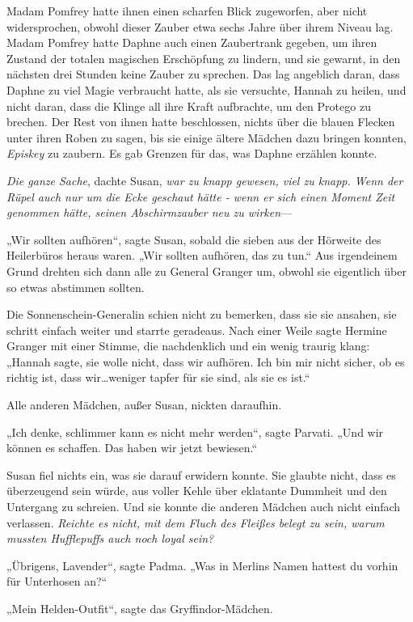 {Madam Pomfrey hatte ihnen einen scharfen Blick zugeworfen, aber nicht widersprochen, obwohl dieser Zauber etwa sechs Jahre über ihrem Niveau lag. Madam Pomfrey hatte Daphne auch einen Zaubertrank gegeben, um ihren Zustand der totalen magischen Erschöpfung zu lindern, und sie gewarnt, in den nächsten drei Stunden keine Zauber zu sprechen. Das lag angeblich daran, dass Daphne zu viel Magie verbraucht hatte, als sie versuchte, Hannah zu heilen, und nicht daran, dass die Klinge all ihre Kraft aufbrachte, um den Protego zu brechen. Der Rest von ihnen hatte beschlossen, nichts über die blauen Flecken unter ihren Roben zu sagen, bis sie einige ältere Mädchen dazu bringen konnten, \emph{Episkey} zu zaubern. Es gab Grenzen für das, was Daphne erzählen konnte.

\emph{Die ganze Sache}, dachte Susan, \emph{war zu knapp gewesen, viel zu knapp. Wenn der Rüpel auch nur um die Ecke geschaut hätte - wenn er sich einen Moment Zeit genommen hätte, seinen Abschirmzauber neu zu wirken}—

„Wir sollten aufhören“, sagte Susan, sobald die sieben aus der Hörweite des Heilerbüros heraus waren. „Wir sollten aufhören, das zu tun.“ Aus irgendeinem Grund drehten sich dann alle zu General Granger um, obwohl sie eigentlich über so etwas abstimmen sollten.

Die Sonnenschein-Generalin schien nicht zu bemerken, dass sie sie ansahen, sie schritt einfach weiter und starrte geradeaus. Nach einer Weile sagte Hermine Granger mit einer Stimme, die nachdenklich und ein wenig traurig klang: „Hannah sagte, sie wolle nicht, dass wir aufhören. Ich bin mir nicht sicher, ob es richtig ist, dass wir…weniger tapfer für sie sind, als sie es ist.“

Alle anderen Mädchen, außer Susan, nickten daraufhin.

„Ich denke, schlimmer kann es nicht mehr werden“, sagte Parvati. „Und wir können es schaffen. Das haben wir jetzt bewiesen.“

Susan fiel nichts ein, was sie darauf erwidern konnte. Sie glaubte nicht, dass es überzeugend sein würde, aus voller Kehle über eklatante Dummheit und den Untergang zu schreien. Und sie konnte die anderen Mädchen auch nicht einfach verlassen. \emph{Reichte es nicht, mit dem Fluch des Fleißes belegt zu sein, warum mussten Hufflepuffs auch noch loyal sein?}

„Übrigens, Lavender“, sagte Padma. „Was in Merlins Namen hattest du vorhin für Unterhosen an?“

„Mein Helden-Outfit“, sagte das Gryffindor-Mädchen.

}
